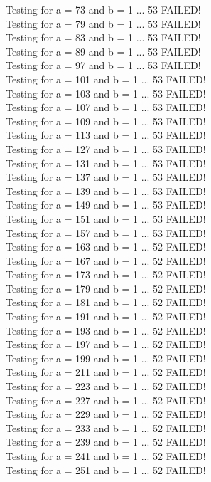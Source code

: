 \documentclass[12pt, letterpaper]{report}
\begin{document}
  Testing for a = 73 and b = 1 ... 53 FAILED! \\
  Testing for a = 79 and b = 1 ... 53 FAILED! \\
  Testing for a = 83 and b = 1 ... 53 FAILED! \\
  Testing for a = 89 and b = 1 ... 53 FAILED! \\
  Testing for a = 97 and b = 1 ... 53 FAILED! \\
  Testing for a = 101 and b = 1 ... 53 FAILED! \\
  Testing for a = 103 and b = 1 ... 53 FAILED! \\
  Testing for a = 107 and b = 1 ... 53 FAILED! \\
  Testing for a = 109 and b = 1 ... 53 FAILED! \\
  Testing for a = 113 and b = 1 ... 53 FAILED! \\
  Testing for a = 127 and b = 1 ... 53 FAILED! \\
  Testing for a = 131 and b = 1 ... 53 FAILED! \\
  Testing for a = 137 and b = 1 ... 53 FAILED! \\
  Testing for a = 139 and b = 1 ... 53 FAILED! \\
  Testing for a = 149 and b = 1 ... 53 FAILED! \\
  Testing for a = 151 and b = 1 ... 53 FAILED! \\
  Testing for a = 157 and b = 1 ... 53 FAILED! \\
  Testing for a = 163 and b = 1 ... 52 FAILED! \\
  Testing for a = 167 and b = 1 ... 52 FAILED! \\
  Testing for a = 173 and b = 1 ... 52 FAILED! \\
  Testing for a = 179 and b = 1 ... 52 FAILED! \\
  Testing for a = 181 and b = 1 ... 52 FAILED! \\
  Testing for a = 191 and b = 1 ... 52 FAILED! \\
  Testing for a = 193 and b = 1 ... 52 FAILED! \\
  Testing for a = 197 and b = 1 ... 52 FAILED! \\
  Testing for a = 199 and b = 1 ... 52 FAILED! \\
  Testing for a = 211 and b = 1 ... 52 FAILED! \\
  Testing for a = 223 and b = 1 ... 52 FAILED! \\
  Testing for a = 227 and b = 1 ... 52 FAILED! \\
  Testing for a = 229 and b = 1 ... 52 FAILED! \\
  Testing for a = 233 and b = 1 ... 52 FAILED! \\
  Testing for a = 239 and b = 1 ... 52 FAILED! \\
  Testing for a = 241 and b = 1 ... 52 FAILED! \\
  Testing for a = 251 and b = 1 ... 52 FAILED! \\
\end{document}
